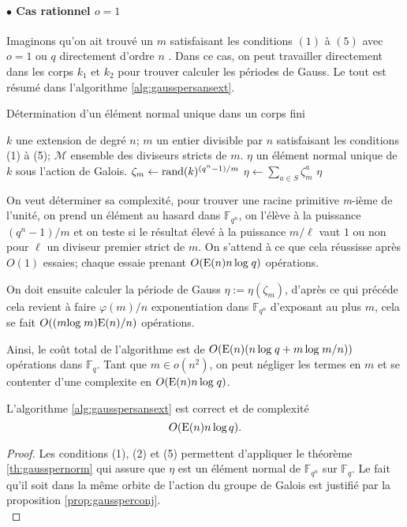 \documentclass[a4paper]{article} %
\numberwithin{section}{part}
\numberwithin{equation}{section}
\newcommand\nroot[1]{\textit{#1}-ième}
\newcommand\GF[1]{\mathbb{F}_{#1}}
\newcommand\E[1]{\textup{E}(#1)}
\begin{document}
\paragraph{$\bullet$ Cas rationnel $o = 1$}
Imaginons qu'on ait trouvé un $m$ satisfaisant les conditions $(1)$ à $(5)$ avec
$o = 1$ ou $q$ directement d'ordre $n$ . Dans ce cas, on peut travailler 
directement dans les corps $k_1$ et $k_2$ pour trouver calculer les périodes de
Gauss. Le tout est résumé dans l'algorithme \ref{alg:gausspersansext}.

\begin{algorithm}
\caption{Détermination d'un élément normal unique dans un corps fini}
\label{alg:gausspersansext}
\begin{algorithmic}[1]
\REQUIRE $k$ une extension de degré $n$; $m$ un entier divisible par $n$
satisfaisant les conditions (1) à (5); $\mathcal{M}$ ensemble des diviseurs
stricts de $m$.
\ENSURE $\eta$ un élément normal unique de $k$ sous l'action de Galois.
\bigskip
\REPEAT
    \STATE $\zeta_m \leftarrow \textup{rand}(k)^{(q^n - 1)/m}$
\STATE $\eta \leftarrow \sum_{a\in S}{\zeta_m^a}$
\RETURN $\eta$
\end{algorithmic}
\end{algorithm}
On veut déterminer sa complexité, pour trouver une racine primitive 
\nroot{m} de l'unité, on prend un élément au hasard dans $\GF{q^n}$, on l'élève 
à la puissance $(q^n - 1)/m$ et on teste si le résultat élevé à la puissance 
$m/\ell$ vaut $1$ ou non pour $\ell$ un diviseur premier strict de $m$. On 
s'attend à ce que cela réussisse après $O(1)$ essaies; chaque essaie prenant 
$O(\E{n}n\,\textup{log\;}q)$ opérations.\par
On doit ensuite calculer la période de Gauss $\eta := \eta(\zeta_m)$,
d'après ce qui précéde cela revient à faire $\varphi(m)/n$ exponentiation dans
$\GF{q^n}$ d'exposant au plus $m$, cela se fait $O((m\textup{log\;}m)\E{n}/n)$
opérations.\par
Ainsi, le coût total de l'algorithme est de $O(\E{n}(n\,\textup{log\;}q +
m\,\textup{log\;}m/n))$ opérations dans $\GF{q}$. Tant que $m\in o(n^2)$, on 
peut négliger les termes en $m$ et se contenter d'une complexite en 
$O(\E{n}n\,\textup{log\;}q)$.

\begin{prop}
\label{prop:algsansext}
L'algorithme \ref{alg:gausspersansext} est correct et de complexité
\begin{equation}
O(\E{n}n\,\textup{log\,}q).
\end{equation}
\end{prop}
\begin{proof}
Les conditions (1), (2) et (5) permettent d'appliquer le théorème 
\ref{th:gausspernorm} qui assure que $\eta$ est un élément normal de 
$\GF{q^n}$ sur $\GF{q}$. Le fait qu'il soit dans la même orbite de l'action du
groupe de Galois est justifié par la proposition \ref{prop:gaussperconj}.\\
\end{proof}
\end{document}
